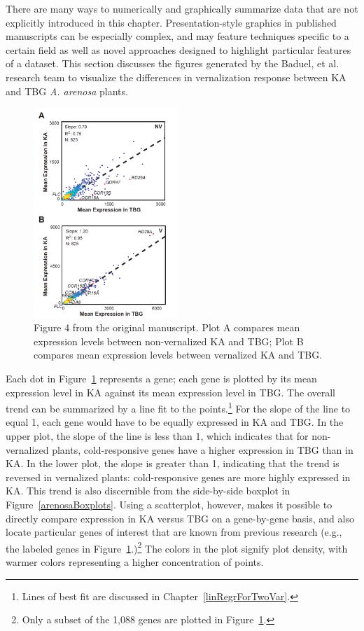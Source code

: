 There are many ways to numerically and graphically summarize data that are not explicitly introduced in this chapter. Presentation-style graphics in published manuscripts can be especially complex, and may feature techniques specific to a certain field as well as novel approaches designed to highlight particular features of a dataset. This section discusses the figures generated by the Baduel, et al. research team to visualize the differences in vernalization response between KA and TBG \textit{A. arenosa} plants.

\begin{figure}[h]
	\centering
	\includegraphics[width=0.48\textwidth]{ch_intro_to_data_oi_biostat/figures/arenosaVisFigs/Fig4_PB}
	\caption{Figure 4 from the original manuscript. Plot A compares mean expression levels between non-vernalized KA and TBG;  Plot B compares mean expression levels between vernalized KA and TBG.}
	\label{arenosaFig4PB}
\end{figure}

Each dot in Figure~\ref{arenosaFig4PB} represents a gene; each gene is plotted by its mean expression level in KA against its mean expression level in TBG. The overall trend can be summarized by a line fit to the points.\footnote{Lines of best fit are discussed in Chapter~\ref{linRegrForTwoVar}.} For the slope of the line to equal 1, each gene would have to be equally expressed in KA and TBG. In the upper plot, the slope of the line is less than 1, which indicates that for non-vernalized plants, cold-responsive genes have a higher expression in TBG than in KA. In the lower plot, the slope is greater than 1, indicating that the trend is reversed in vernalized plants: cold-responsive genes are more highly expressed in KA. This trend is also discernible from the side-by-side boxplot in Figure~\ref{arenosaBoxplots}. Using a scatterplot, however, makes it possible to directly compare expression in KA versus TBG on a gene-by-gene basis, and also locate particular genes of interest that are known from previous research (e.g., the labeled genes in Figure~\ref{arenosaFig4PB}.)\footnote{Only a subset of the 1,088 genes are plotted in Figure~\ref{arenosaFig4PB}.} The colors in the plot signify plot density, with warmer colors representing a higher concentration of points.

